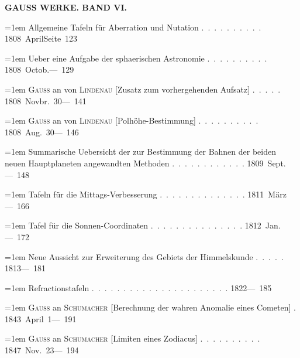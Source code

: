 \clearpage
{}
\noindent{}%
\parbox[b]{\dimexpr\textwidth-20mm\relax}{\centering\small\textbf{GAUSS WERKE. BAND VI.}}%
\makebox[10mm][r]{}\par\nobreak\medskip
\begingroup
\raggedright
\noindent\hangindent=1em Allgemeine Tafeln für Aberration und Nutation \mbox{.\ .\ .\ .\ .\ .\ .\ .\ .\ .} \hfill\mbox{1808 April}\quad\mbox{Seite 123}\par\smallskip
\noindent\hangindent=1em Ueber eine Aufgabe der sphaerischen Astronomie \mbox{.\ .\ .\ .\ .\ .\ .\ .\ .\ .} \hfill\mbox{1808 Octob.}\quad\mbox{--- 129}\par\smallskip
\noindent\hangindent=1em \textsc{Gauss} an von \textsc{Lindenau} [Zusatz zum vorhergehenden Aufsatz] \mbox{.\ .\ .\ .\ .} \hfill\mbox{1808 Novbr. 30}\quad\mbox{--- 141}\par\smallskip
\noindent\hangindent=1em \textsc{Gauss} an von \textsc{Lindenau} [Polhöhe-Bestimmung] \mbox{.\ .\ .\ .\ .\ .\ .\ .\ .\ .} \hfill\mbox{1808 Aug. 30}\quad\mbox{--- 146}\par\smallskip
\noindent\hangindent=1em Summarische Uebersicht der zur Bestimmung der Bahnen der beiden neuen Hauptplaneten angewandten Methoden \mbox{.\ .\ .\ .\ .\ .\ .\ .\ .\ .\ .\ .} \hfill\mbox{1809 Sept.}\quad\mbox{--- 148}\par\smallskip
\noindent\hangindent=1em Tafeln für die Mittags-Verbesserung \mbox{.\ .\ .\ .\ .\ .\ .\ .\ .\ .\ .\ .\ .\ .} \hfill\mbox{1811 März}\quad\mbox{--- 166}\par\smallskip
\noindent\hangindent=1em Tafel für die Sonnen-Coordinaten \mbox{.\ .\ .\ .\ .\ .\ .\ .\ .\ .\ .\ .\ .\ .\ .} \hfill\mbox{1812 Jan.}\quad\mbox{--- 172}\par\smallskip
\noindent\hangindent=1em Neue Aussicht zur Erweiterung des Gebiets der Himmelskunde \mbox{.\ .\ .\ .\ .} \hfill\mbox{1813}\quad\mbox{--- 181}\par\smallskip
\noindent\hangindent=1em Refractionstafeln \mbox{.\ .\ .\ .\ .\ .\ .\ .\ .\ .\ .\ .\ .\ .\ .\ .\ .\ .\ .\ .\ .\ .} \hfill\mbox{1822}\quad\mbox{--- 185}\par\smallskip
\noindent\hangindent=1em \textsc{Gauss} an \textsc{Schumacher} [Berechnung der wahren Anomalie eines Cometen] \mbox{.} \hfill\mbox{1843 April 1}\quad\mbox{--- 191}\par\smallskip
\noindent\hangindent=1em \textsc{Gauss} an \textsc{Schumacher} [Limiten eines Zodiacus] \mbox{.\ .\ .\ .\ .\ .\ .\ .\ .\ .} \hfill\mbox{1847 Nov. 23}\quad\mbox{--- 194}\par\smallskip
